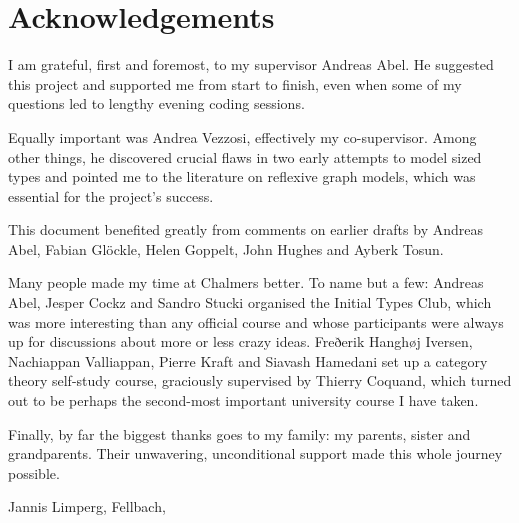 \thispagestyle{plain}			%
\section*{Acknowledgements}

I am grateful, first and foremost, to my supervisor Andreas Abel. He suggested
this project and supported me from start to finish, even when some of my
questions led to lengthy evening coding sessions.

Equally important was Andrea Vezzosi, effectively my co-supervisor. Among other
things, he discovered crucial flaws in two early attempts to model sized types
and pointed me to the literature on reflexive graph models, which was essential
for the project's success.

This document benefited greatly from comments on earlier drafts by Andreas Abel,
Fabian Glöckle, Helen Goppelt, John Hughes and Ayberk Tosun.

Many people made my time at Chalmers better. To name but a few: Andreas Abel,
Jesper Cockz and Sandro Stucki organised the Initial Types Club, which was more
interesting than any official course and whose participants were always up for
discussions about more or less crazy ideas. Freðerik Hanghøj Iversen, Nachiappan
Valliappan, Pierre Kraft and Siavash Hamedani set up a category theory
self-study course, graciously supervised by Thierry Coquand, which turned out to
be perhaps the second-most important university course I have taken.

Finally, by far the biggest thanks goes to my family: my parents, sister and
grandparents. Their unwavering, unconditional support made this whole journey
possible.


\vspace{1.5cm}
\hfill
Jannis Limperg, Fellbach, \monthname \space \the\year

\newpage				%
\thispagestyle{empty}
\mbox{}